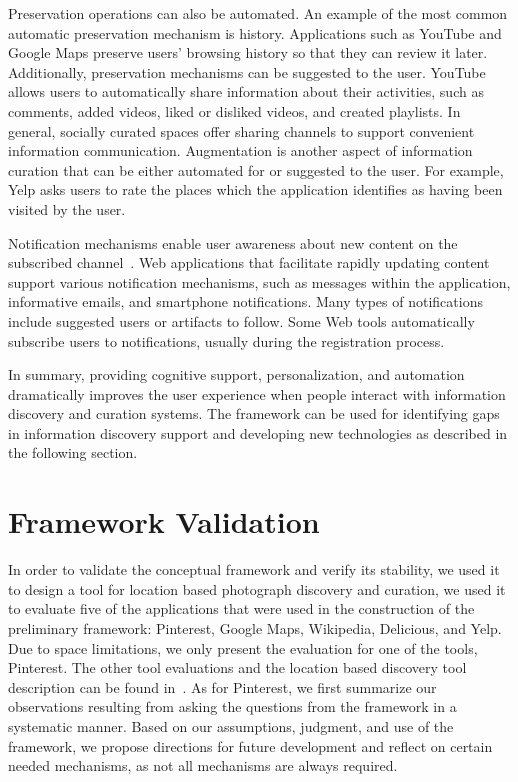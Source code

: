 \documentclass[review]{elsarticle}
\newcommand{\feature}[1]{{\ttfamily#1}}
\begin{document}
{{{{Preservation operations can also be automated. An example of the most common automatic preservation mechanism is \feature{history}. Applications such as YouTube and Google Maps preserve users' browsing history so that they can review it later. Additionally, preservation mechanisms can be \feature{suggested} to the user.
% 
YouTube allows users to \feature{automatically share} information about their activities, such as comments,  added videos, liked or disliked videos, and created playlists. In general, socially curated spaces offer \feature{sharing channels} to support convenient information communication.
%
Augmentation is another aspect of information curation that can be either \feature{automated} for or \feature{suggested} to the user. For example, Yelp asks users to rate the places which the application identifies as having been visited by the user. 

Notification mechanisms enable user awareness about new content on the subscribed channel~\cite{millen2005social}. Web applications that facilitate rapidly updating content support various notification mechanisms, such as messages within the application, informative emails, and smartphone notifications. Many types of notifications include suggested users or artifacts to follow. Some Web tools automatically subscribe users to notifications, usually during the registration process.
} %

In summary, providing cognitive support, personalization, and automation dramatically improves the user experience when people interact with information discovery and curation systems. The framework can be used for identifying gaps in information discovery support and developing new technologies as described in the following section.  
}

\section{Framework Validation}
\label{section:validation}
In order to validate the conceptual framework and verify its stability, we used it to design a tool for location based photograph discovery and curation, we used it to evaluate five of the applications that were used in the construction of the preliminary framework: Pinterest, Google Maps, Wikipedia, Delicious, and Yelp. Due to space limitations, we only present the evaluation for one of the tools, Pinterest. The other tool evaluations and the location based discovery tool description can be found in~\cite{voyloshnikova2015}. As for Pinterest, we first summarize our observations resulting from asking the questions from the framework in a systematic manner. Based on our assumptions, judgment, and use of the framework, we propose directions for future development and reflect on certain needed mechanisms, as not all mechanisms are always required. 

}}
\end{document}
